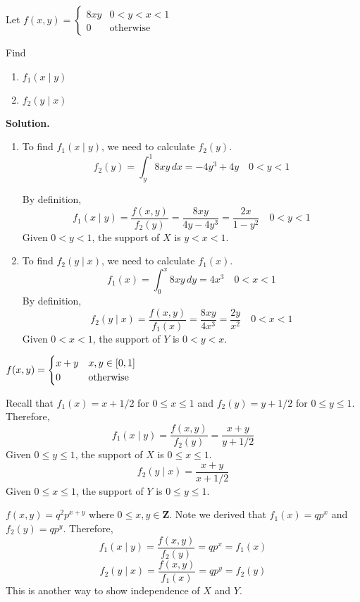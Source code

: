 \begin{Example}{}{}
    Let $ \displaystyle f(x,y)=\begin{cases}
            8 x y & 0<y<x<1          \\
            0     & \text{otherwise}
        \end{cases}  $

    Find
    \begin{enumerate}[label=(\roman*)]
        \item $ f_1(x\mid y) $
        \item $ f_2(y\mid x) $
    \end{enumerate}
    \textbf{Solution.}
    \begin{enumerate}[label=(\roman*)]
        \item To find $ f_1(x\mid y) $, we need to calculate
              $ f_2(y) $.
              \[ f_2(y)=\int_{y}^{1} 8xy\, d{x}=-4y^3+4y \quad 0<y<1 \]

              By definition,
              \[ f_1(x\mid y)=\frac{f(x,y)}{f_2(y)}=
                  \frac{8xy}{4y-4y^3}=\frac{2x}{1-y^2} \quad 0<y<1 \]
              Given $ 0<y<1 $, the support
              of $ X $ is $ y<x<1 $.
        \item To find $ f_2(y\mid x) $, we need to calculate $ f_1(x) $.
              \[ f_1(x)=\int_{0}^{x} 8xy\, d{y}=4x^3\quad 0<x<1 \]
              By definition,
              \[ f_2(y\mid x)=\frac{f(x,y)}{f_1(x)} =\frac{8xy}{4x^3} =\frac{2y}{x^2} \quad 0<x<1 \]
              Given $ 0<x<1 $, the support of $ Y $ is $ 0<y<x $.
    \end{enumerate}
\end{Example}
\begin{Example}{}{}
    $ \displaystyle f(x,y)=\begin{cases}
            x+y & x,y\in\interval{0}{1} \\
            0   & \text{otherwise}
        \end{cases} $

    Recall that $ f_1(x)=x+1/2 $ for $ 0\le x\le 1 $ and
    $ f_2(y)=y+1/2 $ for $ 0\le y\le 1 $. Therefore,
    \[ f_1(x\mid y)=\frac{f(x,y)}{f_2(y)} =\frac{x+y}{y+1/2} \]
    Given $ 0\le y\le 1 $, the support of $ X $ is $ 0\le x\le 1 $.
    \[ f_2(y\mid x)=\frac{x+y}{x+1/2} \]
    Given $ 0\le x\le 1 $, the support of $ Y $ is $ 0\le y\le 1 $.
\end{Example}
\begin{Example}{}{}
    $ f(x,y)=q^2p^{x+y} $ where $ 0\le x,y\in\mathbf{Z} $. Note we derived
    that $ f_1(x)=qp^x $ and $ f_2(y)=qp^y $. Therefore,
    \[ f_1(x\mid y)=\frac{f(x,y)}{f_2(y)} =qp^x=f_1(x) \]
    \[ f_2(y\mid x)=\frac{f(x,y)}{f_1(x)}=qp^y=f_2(y) \]
    This is another way to show independence of $ X $ and $ Y $.
\end{Example}
